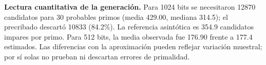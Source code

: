 \noindent\textbf{Lectura cuantitativa de la generación.} Para 1024 bits se necesitaron 12870 candidatos para 30 probables primos (media 429.00, mediana 314.5); el precribado descartó 10833 (84.2\%). La referencia asintótica es 354.9 candidatos impares por primo. Para 512 bits, la media observada fue 176.90 frente a 177.4 estimados. Las diferencias con la aproximación pueden reflejar variación muestral; por sí solas no prueban ni descartan errores de primalidad.\par
